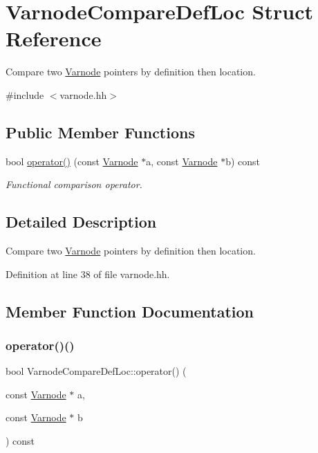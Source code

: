 \hypertarget{struct_varnode_compare_def_loc}{}\section{Varnode\+Compare\+Def\+Loc Struct Reference}
\label{struct_varnode_compare_def_loc}


Compare two \mbox{\hyperlink{class_varnode}{Varnode}} pointers by definition then location.  




{\ttfamily \#include $<$varnode.\+hh$>$}

\subsection*{Public Member Functions}
\begin{DoxyCompactItemize}
\item 
bool \mbox{\hyperlink{struct_varnode_compare_def_loc_a05647c5663f7fedb15a7de0555fa66fe}{operator()}} (const \mbox{\hyperlink{class_varnode}{Varnode}} $\ast$a, const \mbox{\hyperlink{class_varnode}{Varnode}} $\ast$b) const
\begin{DoxyCompactList}\small\item\em Functional comparison operator. \end{DoxyCompactList}\end{DoxyCompactItemize}


\subsection{Detailed Description}
Compare two \mbox{\hyperlink{class_varnode}{Varnode}} pointers by definition then location. 

Definition at line 38 of file varnode.\+hh.



\subsection{Member Function Documentation}
\mbox{\label{struct_varnode_compare_def_loc_a05647c5663f7fedb15a7de0555fa66fe}} 
\subsubsection{\texorpdfstring{operator()()}{operator()()}}
{\footnotesize\ttfamily bool Varnode\+Compare\+Def\+Loc\+::operator() (\begin{DoxyParamCaption}\item[{const \mbox{\hyperlink{class_varnode}{Varnode}} $\ast$}]{a,  }\item[{const \mbox{\hyperlink{class_varnode}{Varnode}} $\ast$}]{b }\end{DoxyParamCaption}) const\hspace{0.3cm}{\ttfamily [inline]}}



